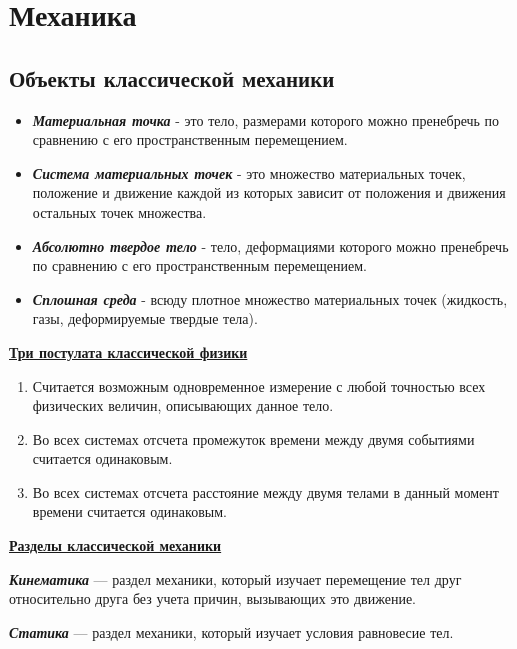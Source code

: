 \chapter{Механика}
\section{Объекты классической механики}
\begin{itemize}
    \item {} \textbf{\textit{Материальная точка}} - это тело, размерами которого можно пренебречь по сравнению с его пространственным перемещением.
    \item {} \textbf{\textit{Система материальных точек} }- это множество материальных точек, положение и движение каждой из которых зависит от положения и движения остальных точек множества.
    \item {} \textbf{\textit{Абсолютно твердое тело}} - тело, деформациями которого можно пренебречь по сравнению с его пространственным перемещением.
    \item {} \textbf{\textit{Сплошная среда}} - всюду плотное множество материальных точек (жидкость, газы, деформируемые твердые тела).
\end{itemize}

\vspace{5px}

\underline{\textbf{Три постулата классической физики}}
\begin{enumerate}
    \item Считается возможным одновременное измерение с любой точностью всех физических величин, описывающих данное тело.
    \item Во всех системах отсчета промежуток времени между двумя событиями считается одинаковым.
    \item Во всех системах отсчета расстояние между двумя телами в данный момент времени считается одинаковым.
\end{enumerate}

\underline{\textbf{Разделы классической механики}}

\vspace{5px}

 \textbf{\textit{Кинематика}} --- раздел механики, который изучает перемещение тел друг относительно друга без учета причин, вызывающих это движение.

\vspace{5px}

 \textbf{\textit{Статика}} --- раздел механики, который изучает условия равновесие тел.

